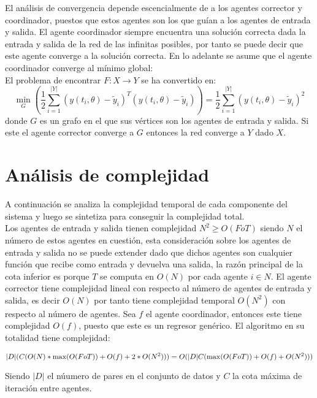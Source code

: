     El análisis de convergencia depende escencialmente de a los agentes corrector y coordinador, puestos que estos agentes son los que guían a los agentes 
    de entrada y salida. El agente coordinador siempre encuentra una solución correcta dada la entrada y salida de la red de las infinitas posibles, por tanto se 
    puede decir que este agente converge a la solución correcta. En lo adelante se asume que el agente coordinador converge al mínimo global: \\

    El problema de encontrar $F:X \rightarrow Y$ se ha convertido en: $$\underset{G}{\min}(\frac{1}{2} \sum_{i=1}^{|Y|} (y(t_i, \theta) - \tilde{y}_i)^T (y(t_i,    \theta) - \tilde{y}_i))= \frac{1}{2} \sum_{i=1}^{|Y|} (y(t_i, \theta) - \tilde{y}_i)^2$$ donde $G$ es un grafo en el que sus vértices son los agentes de entrada y salida. Si 
    este el agente corrector converge a $G$  entonces la red converge a $Y$ dado $X$.


 \section*{Análisis de complejidad}

    A continuación se analiza la complejidad temporal de cada componente del sistema y luego se sintetiza para conseguir la complejidad total. \\

    Los agentes de entrada y salida tienen complejidad $N^2 \geq O(FoT) $ siendo $N$ el número de estos agentes en cuestión, esta consideración 
    sobre los agentes de entrada y salida no se puede extender dado que dichos agentes son cualquier función que recibe como entrada y devuelva una salida, la 
    razón principal de la cota inferior es porque $T$ se computa en $O(N)$ por cada agente $i \in N$. El agente corrector tiene complejidad lineal con respecto al número de agentes 
    de entrada y salida, es decir $O(N)$ por tanto tiene complejidad temporal $O(N^2)$ con respecto al número de agentes. Sea $f$ el agente coordinador, entonces este tiene complejidad $O(f)$, puesto que este es un regresor genérico. 
    El algoritmo en su totalidad tiene complejidad: 
    \begin{center}
        
        \begin{equation*}
                
                |D|(C( O(N) * \max(O(F o T )) + O(f) + 2 * O(N^2) )) \\
                = O(|D|C( \max(O(F o T )) + O(f) + O(N^2)))\\

        \end{equation*}

    \end{center}

Siendo $|D|$ el núumero de pares en el conjunto de datos y $C$ la cota máxima de iteración entre agentes.
